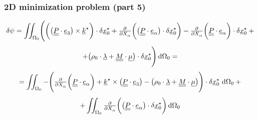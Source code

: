 \begin{frame}
  \frametitle{2D minimization problem (part 5)}
  \vspace{-1em}
  \begin{displaymath}
    \delta \psi = 
    \iint_{\Omega_0} \Biggl(
      \biggl( \bigl( \doubleunderline{P} \cdot \underline{e}_3 \bigr) \times \underline{k}^{\star} \biggr) \cdot \delta \underline{x}_0^{\star} +
      \pd{}{X_{\alpha}} \biggl( \bigl( \doubleunderline{P} \cdot \underline{e}_{\alpha} \bigr) \cdot \delta \underline{x}_0^{\star} \biggr) -
      \pd{}{X_{\alpha}} \biggl( \doubleunderline{P} \cdot \underline{e}_{\alpha} \biggr) \cdot \delta \underline{x}_0^{\star} \: +
  \end{displaymath}
  \begin{displaymath}
      + \bigl(
        \rho_0 \cdot \underline{\lambda} +
        \doubleunderline{M} \cdot \underline{\mu}
      \bigr) \cdot \delta \underline{x}_0^{\star}
    \Biggr) \dif \Omega_0 =
  \end{displaymath}
  \begin{displaymath}
    = \iint_{\Omega_0} - \Biggl(
      \pd{}{X_{\alpha}} \biggl( \doubleunderline{P} \cdot \underline{e}_{\alpha} \biggr) +
      \underline{k}^{\star} \times \bigl( \doubleunderline{P} \cdot \underline{e}_3 \bigr) -
      \bigl(
        \rho_0 \cdot \underline{\lambda} +
        \doubleunderline{M} \cdot \underline{\mu}
      \bigr)
    \Biggr) \cdot \delta \underline{x}_0^{\star} \, \dif \Omega_0 \: +
  \end{displaymath}
  \begin{displaymath}
    + \iint_{\Omega_0}
      \pd{}{X_{\alpha}} \biggl( \bigl( \doubleunderline{P} \cdot \underline{e}_{\alpha} \bigr) \cdot \delta \underline{x}_0^{\star} \biggr)
    \dif \Omega_0
  \end{displaymath}
  
  
\end{frame}


